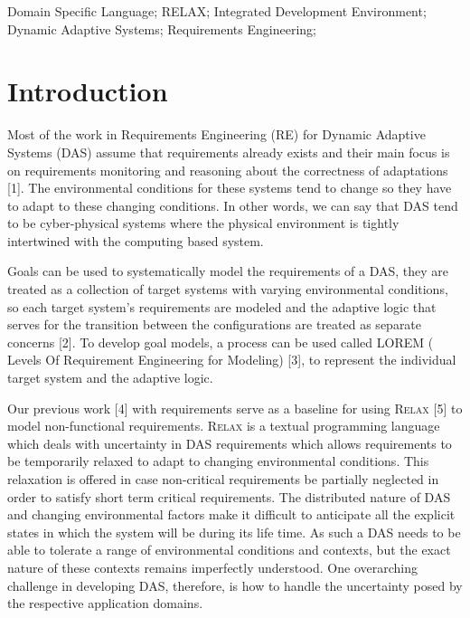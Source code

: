 \documentclass[10pt, conference, compsocconf]{IEEEtran}
\def\myrelax{\textsc{Relax}}                  %
\begin{document}
\begin{IEEEkeywords}
Domain Specific Language; RELAX; Integrated Development Environment; Dynamic Adaptive Systems; Requirements Engineering;

\end{IEEEkeywords}


%
\IEEEpeerreviewmaketitle


\section{Introduction}

Most of the work in Requirements Engineering (RE) for Dynamic Adaptive Systems (DAS) assume that requirements already exists and their main focus is on requirements monitoring and reasoning about the correctness of adaptations [1]. The environmental conditions for these systems tend to change so they have to adapt to these changing conditions.  In other words, we can say that DAS tend to be cyber-physical systems where the physical environment is tightly intertwined with the computing based system. 

Goals can be used to systematically model the requirements of a DAS, they are treated as a collection of target systems with varying environmental conditions, so each target system's requirements are modeled and the adaptive logic that serves for the transition between the configurations are treated as separate concerns [2]. To develop goal models, a process can be used called LOREM ( Levels Of Requirement Engineering for Modeling) [3], to represent the individual target system and the adaptive logic. 

Our previous work [4] with requirements serve as a baseline for using \myrelax{} [5] to model non-functional requirements. \myrelax{} is a textual programming language which deals with uncertainty in DAS requirements which allows requirements to be temporarily relaxed to adapt to changing environmental conditions. This relaxation is offered in case non-critical requirements be partially neglected in order to satisfy short term critical requirements. The distributed nature of DAS and changing environmental factors make it difficult to anticipate all the explicit states in which the system will be during its life time. As such a DAS needs to be able to tolerate a range of environmental conditions and contexts, but the exact nature of these contexts remains imperfectly understood. One overarching challenge in developing DAS, therefore, is how to handle the uncertainty posed by the respective application domains. 
\end{document}
